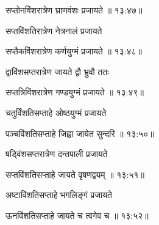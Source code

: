 
{\devanagarifont सप्तोनविंशरात्रेण घ्राणवंशः प्रजायते {॥ १३:४७॥} \veg\dontdisplaylinenum }%
 
{\devanagarifont सप्तविंशतिरात्रेण नेत्रनालं प्रजायते \thinspace{\dandab} \dontdisplaylinenum }%


{\devanagarifont सप्तैकविंशरात्रेण कर्णयुग्मं प्रजायते {॥ १३:४८॥} \veg\dontdisplaylinenum }%
 
{\devanagarifont द्वाविंशसप्तरात्रेण जायते द्वौ भ्रुवौ ततः \thinspace{\dandab} \dontdisplaylinenum }%
 

{\devanagarifont सप्तत्रिविंशरात्रेण गण्डयुग्मं प्रजायते {॥ १३:४९॥} \veg\dontdisplaylinenum }%
 
{\devanagarifont चतुर्विंशतिसप्ताहे ओष्ठयुग्मं प्रजायते \thinspace{\dandab} \dontdisplaylinenum }%
 

{\devanagarifont पञ्चविंशतिसप्ताहे जिह्वा जायेत सुन्दरि {॥ १३:५०॥} \veg\dontdisplaylinenum }%
 
{\devanagarifont षड्विंशसप्तरात्रेण दन्तपाली प्रजायते \thinspace{\dandab} \dontdisplaylinenum }%


{\devanagarifont सप्तविंशतिसप्ताहे जायते वृषणद्वयम् {॥ १३:५१॥} \veg\dontdisplaylinenum }%

{\devanagarifont अष्टाविंशतिसप्ताहे भगलिङ्गं प्रजायते \thinspace{\dandab} \dontdisplaylinenum }%
 

{\devanagarifont ऊनविंशतिसप्ताहे जायते च त्वगेव च {॥ १३:५२॥} \veg\dontdisplaylinenum }%

